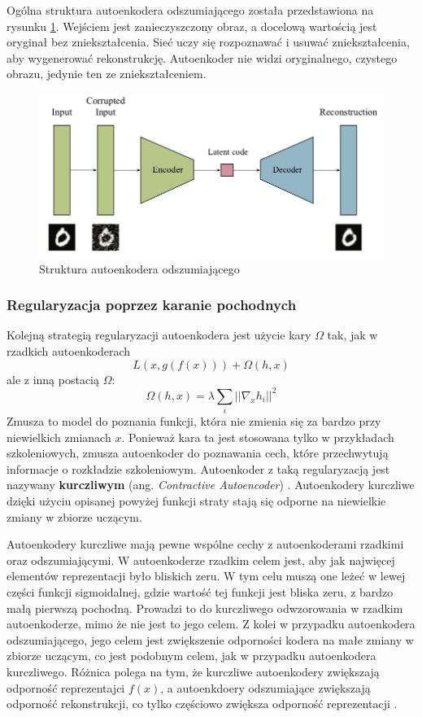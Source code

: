 \documentclass[12pt]{mwbk}
\theoremstyle{plain}
\theoremstyle{definition}
\theoremstyle{remark}
\begin{document}
Ogólna struktura autoenkodera odszumiającego została przedstawiona na rysunku \ref{fig:denoising-structure}. Wejściem jest zanieczyszczony obraz, a docelową wartością jest oryginał bez zniekształcenia. Sieć uczy się rozpoznawać i usuwać zniekształcenia, aby wygenerować rekonstrukcję. Autoenkoder nie widzi oryginalnego, czystego obrazu, jedynie ten ze zniekształceniem. 

\begin{figure}[!h]
	\centering
	\includegraphics[width=\linewidth]{rys/denoising_autoencoder.png}
	\caption{Struktura autoenkodera odszumiającego}
	\label{fig:denoising-structure}
\end{figure}


\newpage

\subsubsection{Regularyzacja poprzez karanie pochodnych}

Kolejną strategią regularyzacji autoenkodera jest użycie kary $\Omega$ tak, jak w rzadkich autoenkoderach
$$L(x, g(f(x)))+\Omega(h,x)$$
ale z inną postacią $\Omega$:
$$\Omega(h, x)=\lambda \sum_i ||\nabla_x h_i ||^2$$
Zmusza to model do poznania funkcji, która nie zmienia się za bardzo przy niewielkich zmianach $x$. Ponieważ kara ta jest stosowana tylko w przykładach szkoleniowych, zmusza autoenkoder do poznawania cech, które przechwytują informacje o rozkładzie szkoleniowym. Autoenkoder z taką regularyzacją jest nazywany \textbf{kurczliwym} (ang. \emph{Contractive Autoencoder}) \cite{goodfellow}. Autoenkodery kurczliwe dzięki użyciu opisanej powyżej funkcji straty stają się odporne na niewielkie zmiany w zbiorze uczącym.

Autoenkodery kurczliwe mają pewne wspólne cechy z autoenkoderami rzadkimi oraz odszumiającymi. W autoenkoderze rzadkim celem jest, aby jak najwięcej elementów reprezentacji było bliskich zeru. W tym celu muszą one leżeć w lewej części funkcji sigmoidalnej, gdzie wartość tej funkcji jest bliska zeru, z bardzo małą pierwszą pochodną. Prowadzi to do kurczliwego odwzorowania w rzadkim autoenkoderze, mimo że nie jest to jego celem. Z kolei w przypadku autoenkodera odszumiającego, jego celem jest zwiększenie odporności kodera na małe zmiany w zbiorze uczącym, co jest podobnym celem, jak w przypadku autoenkodera kurczliwego. Różnica polega na tym, że kurczliwe autoenkodery zwiększają odporność reprezentajci $f(x)$, a autoenkdoery odszumiające zwiększają odporność rekonstrukcji, co tylko częściowo zwiększa odporność reprezentacji \cite{geeks}. 
\end{document}
